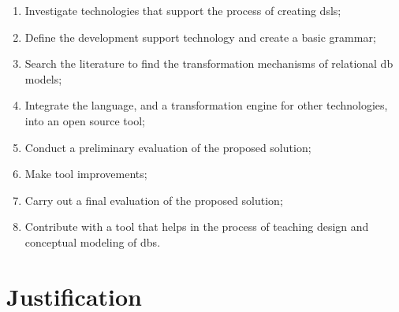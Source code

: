 \begin{enumerate}[label={\arabic*)}]
     \item Investigate technologies that support the process of creating \acp{dsl};
     \item Define the development support technology and create a basic grammar;
     \item Search the literature to find the transformation mechanisms of relational \ac{db} models;
     \item Integrate the language, and a transformation engine for other technologies, into an open source tool;
     \item Conduct a preliminary evaluation of the proposed solution;
     \item Make tool improvements;
     \item Carry out a final evaluation of the proposed solution;
     \item Contribute with a tool that helps in the process of teaching design and conceptual modeling of \acp{db}.
\end{enumerate}


\section{Justification}

